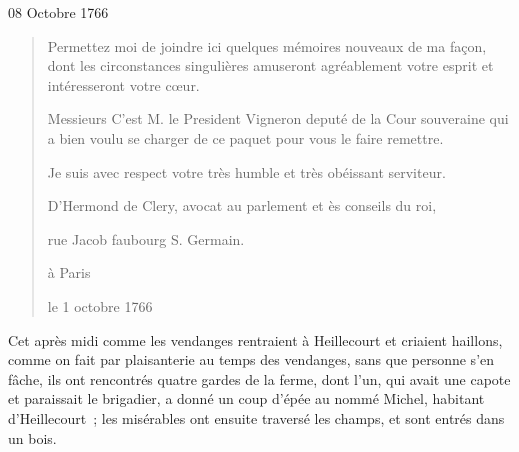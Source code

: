 \begin{diary}{08 Octobre 1766}{}
\begin{quote}
        
                              Permettez moi de joindre ici quelques mémoires
                              nouveaux de ma façon, dont les circonstances
                              singulières amuseront agréablement votre
                              esprit et intéresseront votre cœur. \bigskip
        
         Messieurs
                              C’est M. le President
                                 Vigneron
                              deputé de la Cour souveraine qui
                              a bien voulu se charger de
                              ce paquet pour vous le faire
                              remettre. 
                           \bigskip
        
        
                                 Je suis avec respect
                                 votre très humble et très
                                 obéissant serviteur. \begin{flushright}
                                 D’Hermond de Clery, avocat
                                 au parlement et ès conseils du
                                 roi, \end{flushright}
                                 
                                    rue Jacob faubourg S. Germain.
                                    
                                    à Paris
                                 
                                 le 1 octobre
                                    1766
                              \end{quote}
                        
                           Cet après midi comme les vendanges rentraient
                           à Heillecourt et
                           criaient haillons, comme
                           on fait par plaisanterie au temps des vendanges,
                           sans que personne s’en fâche, ils ont rencontrés
                           quatre gardes de la ferme, dont l’un, qui
                           avait une capote et paraissait le brigadier,
                           a donné un coup d’épée au nommé
                              Michel,
                           habitant d’Heillecourt ;
                           les misérables ont
                           ensuite traversé les champs, et sont
                           entrés dans un bois. \bigskip
        
        
                     \end{diary}

